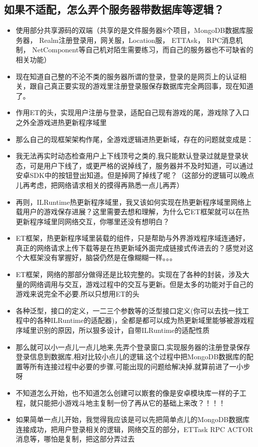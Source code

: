 \documentclass[9pt, b5paper]{article}
\begin{document}
\subsection{如果不适配，怎么弄个服务器带数据库等逻辑？}
\label{sec-2-2}
\begin{itemize}
\item 使用部分共享源码的双端（共享的是文件服务器8个项目，MongoDB数据库服务器， Realm注册登录用，网关服，Location服， ETTAsk， RPC消息机制， NetComponent等自己机对陌生需要练习，而自己的服务器也不可缺省的相关功能）
\item 现在知道自己整的不沦不类的服务器所谓的登录，登录的是网页上的认证相关，跟自己真正要实现的游戏里注册登录服保存数据库完全两回事，现在知道了。
\item 作用ET的头，实现用户注册与登录，适配自己现有游戏的尾，游戏除了入口之外全游戏进热更新程序域里
\item 那么自己的现框架架构作尾，全游戏逻辑进热更新域，存在的问题就变成是：
\item 我无法再实时动态检查用户上下线顶号之类的,我只能默认登录过就是登录状态，可是用户下线了，或更严格的说掉线了，服务器并不及时知道，可以通过安卓SDK中的按钮登出知道。但是掉网了掉线了呢？（这部分的逻辑可以晚点儿再考虑，把网络请求相关的摸得再熟悉一点儿再弄）
\item 再则，ILRuntime热更新程序域里，我又该如何实现在热更新程序域里网络上载用户的游戏保存进展？这里需要去想和理解，为什么它ET框架就可以在热更新程序域里同网络交互，你哪里还没有想明白？
\item ET框架，热更新程序域里装载的组件，只是帮助与外界游戏程序域连通好，真正的网络请求上传下载等是在热更新域外面完成链接式传进去的？感觉对这个大框架没有掌握好，脑袋仍然是在像糊糊一样。。。
\item ET框架，网络的那部分做得还是比较完整的。实现在了各种的封装，涉及大量的网络调用与交互，游戏过程中的交互与更新。但是太多的功能对于自己的游戏来说完全不必要.所以只想用ET的头
\item 各种泛型，接口的定义，一二三个参数等的泛型接口定义(你可以去找一找工程中的各种ILRuntime的适配器)，全都是都可以成为热更新域里能够被游戏程序域里识别的原因，所以狠多设计，自带ILRuntime的适配性质
\item 那么就可以小一点儿一点儿地来,先弄个登录窗口,实现服务器的注册登录保存登录信息到数据库,相对比较小点儿的逻辑.这个过程中把MongoDB数据库的配置等所有连接过程中必要的步骤,可能出现的问题给解决掉,就算前进了一小步呀
\item 不知道怎么开始，也不知道怎么创建可以㠌套的像是安卓模块库一样的子工程，就只能把小游戏斗地主复制一份了再从它的基础上来改？！！！
\item 如果简单一点儿开始，我觉得我应该是可以先把简单点儿的MongoDB数据库连接成功，把用户登录相关的逻辑，网络交互的部分，ETTask RPC ACTOR消息等，哪怕是复制，把这部分弄过去
\end{itemize}
\end{document}
